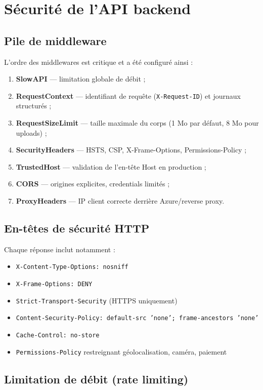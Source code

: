 \section{Sécurité de l'API backend}

\subsection{Pile de middleware}

L'ordre des middlewares est critique et a été configuré ainsi :
\begin{enumerate}
  \item \textbf{SlowAPI} --- limitation globale de débit ;
  \item \textbf{RequestContext} --- identifiant de requête (\texttt{X-Request-ID}) et journaux structurés ;
  \item \textbf{RequestSizeLimit} --- taille maximale du corps (1 Mo par défaut, 8 Mo pour uploads) ;
  \item \textbf{SecurityHeaders} --- HSTS, CSP, X-Frame-Options, Permissions-Policy ;
  \item \textbf{TrustedHost} --- validation de l'en-tête Host en production ;
  \item \textbf{CORS} --- origines explicites, credentials limités ;
  \item \textbf{ProxyHeaders} --- IP client correcte derrière Azure/reverse proxy.
\end{enumerate}

\subsection{En-têtes de sécurité HTTP}

Chaque réponse inclut notamment :
\begin{itemize}
  \item \texttt{X-Content-Type-Options: nosniff}
  \item \texttt{X-Frame-Options: DENY}
  \item \texttt{Strict-Transport-Security} (HTTPS uniquement)
  \item \texttt{Content-Security-Policy: default-src 'none'; frame-ancestors 'none'}
  \item \texttt{Cache-Control: no-store}
  \item \texttt{Permissions-Policy} restreignant géolocalisation, caméra, paiement
\end{itemize}

\subsection{Limitation de débit (rate limiting)}

